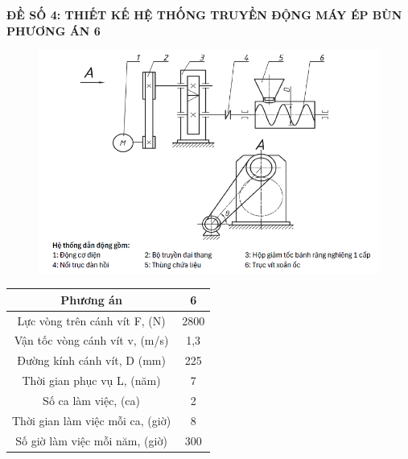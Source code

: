 \thispagestyle{empty}
\begin{center}
    \textbf{\Large{ĐỀ SỐ 4: THIẾT KẾ HỆ THỐNG TRUYỀN ĐỘNG MÁY ÉP BÙN}}\\
    \textbf{\Large{PHƯƠNG ÁN 6}}\\

\end{center}
\begin{figure}[H]
    \centering
    \includegraphics[width=1\textwidth]{pictures/debai.png}
\end{figure}
\begin{center}
\begin{tabular}{|c|c|}
    \hline
    \textbf{Phương án} & \textbf{6} \\
    \hline
    Lực vòng trên cánh vít F, (N) & 2800  \\
    \hline     
    Vận tốc vòng cánh vít v, (m/s) & 1,3  \\
    \hline
    Đường kính cánh vít, D (mm) & 225  \\
    \hline
    Thời gian phục vụ L, (năm) & 7  \\
    \hline
    Số ca làm việc, (ca) & 2  \\
    \hline
    Thời gian làm việc mỗi ca, (giờ) & 8  \\
    \hline
    Số giờ làm việc mỗi năm, (giờ) & 300  \\
    \hline
\end{tabular}
\end{center}
\cleardoublepage